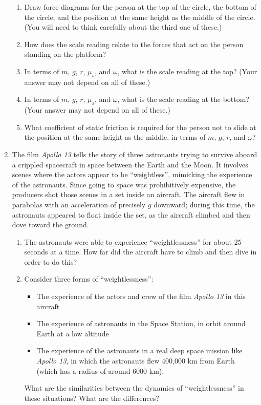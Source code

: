 \documentclass[12pt]{article}
\begin{document}
\begin{enumerate}
\begin{enumerate}
\item Draw force diagrams for the person at the top of the circle, the bottom of the circle, and the position at the 
same height as the middle of the circle. (You will need to think carefully about the third one of these.)
\item How does the scale reading relate to the forces that act on the person standing on the platform?
\item In terms of $m$, $g$, $r$, $\mu_s$, and $\omega$, what is the scale reading at the top? (Your answer may not depend on all of these.)
\item In terms of $m$, $g$, $r$, $\mu_s$, and $\omega$, what is the scale reading at the bottom? (Your answer may not depend on all of these.)
\item What coefficient of static friction is required for the person not to slide at the position at the same height as the middle, in terms of $m$, $g$, $r$, and $\omega$?
\end{enumerate}

\item The film {\it Apollo 13} tells the story of three astronauts trying to survive aboard a crippled spacecraft in
space between the Earth and the Moon. It involves scenes where the actors appear to be ``weightless'', mimicking 
the experience of the astronauts. Since going to space was prohibitively expensive, the producers shot those scenes
in a set inside an aircraft. The aircraft flew in parabolas with an acceleration of precisely $g$ downward; during this time,
the astronauts appeared to float inside the set, as the aircraft climbed and then dove toward the ground.

\begin{enumerate}
\item The astronauts were able to experience ``weightlessness'' for about 25 seconds at a time. How far did the aircraft have
to climb and then dive in order to do this?
\item Consider three forms of ``weightlessness'':
\begin{itemize}
\item The experience of the actors and crew of the film {\it Apollo 13} in this aircraft
\item The experience of astronauts in the Space Station, in orbit around Earth at a low altitude
\item The experience of the astronauts in a real deep space mission like {\it Apollo 13}, in which the astronauts flew
400,000 km from Earth (which has a radius of around 6000 km). 
\end{itemize}
What are the similarities between the dynamics of ``weightlessness'' in these situations? What are the differences? 


\end{enumerate}
\end{enumerate}
\end{document}
